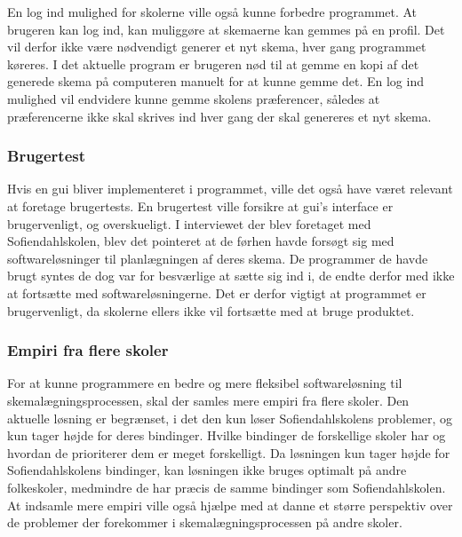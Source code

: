 En log ind mulighed for skolerne ville også kunne forbedre programmet. At brugeren kan log ind, kan muliggøre at skemaerne kan gemmes på en profil. Det vil derfor ikke være nødvendigt generer et nyt skema, hver gang programmet køreres. I det aktuelle program er brugeren nød til at gemme en kopi af det generede skema på computeren manuelt for at kunne gemme det. En log ind mulighed vil endvidere kunne gemme skolens præferencer, således at præferencerne ikke skal skrives ind hver gang der skal genereres et nyt skema. 
\subsubsection{Brugertest}

Hvis en gui bliver implementeret i programmet, ville det også have været relevant at foretage brugertests. En brugertest ville forsikre at gui’s interface er brugervenligt, og overskueligt. I interviewet der blev foretaget med Sofiendahlskolen, blev det pointeret at de førhen havde forsøgt sig med softwareløsninger til planlægningen af deres skema. De programmer de havde brugt syntes de dog var for besværlige at sætte sig ind i, de endte derfor med ikke at fortsætte med softwareløsningerne. Det er derfor vigtigt at programmet er brugervenligt, da skolerne ellers ikke vil fortsætte med at bruge produktet. 
\subsubsection{Empiri fra flere skoler}

For at kunne programmere en bedre og mere fleksibel softwareløsning til skemalægningsprocessen, skal der samles mere empiri fra flere skoler. Den aktuelle løsning er begrænset, i det den kun løser Sofiendahlskolens problemer, og kun tager højde for deres bindinger. Hvilke bindinger de forskellige skoler har og hvordan de prioriterer dem er meget forskelligt. Da løsningen kun tager højde for Sofiendahlskolens bindinger, kan løsningen ikke bruges optimalt på andre folkeskoler, medmindre de har præcis de samme bindinger som Sofiendahlskolen. At indsamle mere empiri ville også hjælpe med at danne et større perspektiv over de problemer der forekommer i skemalægningsprocessen på andre skoler. 
